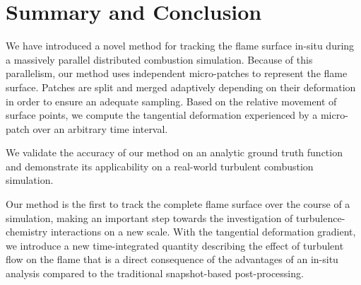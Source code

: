 
%
\section{Summary and Conclusion} %
\label{sec:fst_summary_and_conclusion}
%
We have introduced a novel method for tracking the flame surface in-situ
during a massively parallel distributed combustion simulation.
%
Because of this parallelism, our method uses independent micro-patches to
represent the flame surface.
%
Patches are split and merged adaptively depending on their deformation in order
to ensure an adequate sampling.
%
Based on the relative movement of surface points, we compute the tangential
deformation experienced by a micro-patch over an arbitrary time interval.
%

%
We validate the accuracy of our method on an analytic ground truth function
and demonstrate its applicability on a real-world turbulent combustion
simulation.
%

%
Our method is the first to track the complete flame surface over the course of a
simulation, making an important step towards the investigation of
turbulence-chemistry interactions on a new scale.
%
With the tangential deformation gradient, we introduce a new time-integrated
quantity describing the effect of turbulent flow on the flame that is a direct
consequence of the advantages of an in-situ analysis compared to the
traditional snapshot-based post-processing.
%
